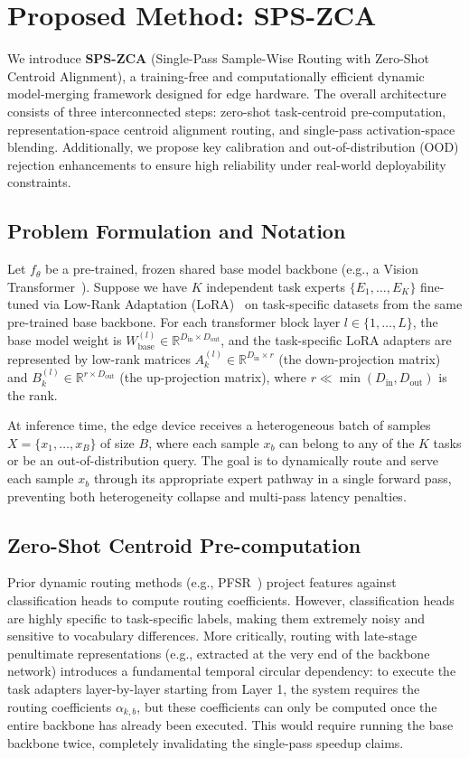 \section{Proposed Method: SPS-ZCA}
\label{sec:method}

We introduce \textbf{SPS-ZCA} (Single-Pass Sample-Wise Routing with Zero-Shot Centroid Alignment), a training-free and computationally efficient dynamic model-merging framework designed for edge hardware. The overall architecture consists of three interconnected steps: zero-shot task-centroid pre-computation, representation-space centroid alignment routing, and single-pass activation-space blending. Additionally, we propose key calibration and out-of-distribution (OOD) rejection enhancements to ensure high reliability under real-world deployability constraints.

\subsection{Problem Formulation and Notation}
Let $f_\theta$ be a pre-trained, frozen shared base model backbone (e.g., a Vision Transformer~\cite{dosovitskiy2020image}).
Suppose we have $K$ independent task experts $\{E_1, \dots, E_K\}$ fine-tuned via Low-Rank Adaptation (LoRA)~\cite{hu2021lora} on task-specific datasets from the same pre-trained base backbone. 
For each transformer block layer $l \in \{1, \dots, L\}$, the base model weight is $W_{\text{base}}^{(l)} \in \mathbb{R}^{D_{\text{in}} \times D_{\text{out}}}$, and the task-specific LoRA adapters are represented by low-rank matrices $A_k^{(l)} \in \mathbb{R}^{D_{\text{in}} \times r}$ (the down-projection matrix) and $B_k^{(l)} \in \mathbb{R}^{r \times D_{\text{out}}}$ (the up-projection matrix), where $r \ll \min(D_{\text{in}}, D_{\text{out}})$ is the rank.

At inference time, the edge device receives a heterogeneous batch of samples $X = \{x_1, \dots, x_B\}$ of size $B$, where each sample $x_b$ can belong to any of the $K$ tasks or be an out-of-distribution query. The goal is to dynamically route and serve each sample $x_b$ through its appropriate expert pathway in a single forward pass, preventing both heterogeneity collapse and multi-pass latency penalties.

\subsection{Zero-Shot Centroid Pre-computation}
Prior dynamic routing methods (e.g., PFSR~\cite{pfsr2025}) project features against classification heads to compute routing coefficients. However, classification heads are highly specific to task-specific labels, making them extremely noisy and sensitive to vocabulary differences.
More critically, routing with late-stage penultimate representations (e.g., extracted at the very end of the backbone network) introduces a fundamental temporal circular dependency: to execute the task adapters layer-by-layer starting from Layer 1, the system requires the routing coefficients $\alpha_{k, b}$, but these coefficients can only be computed once the entire backbone has already been executed. This would require running the base backbone twice, completely invalidating the single-pass speedup claims.


